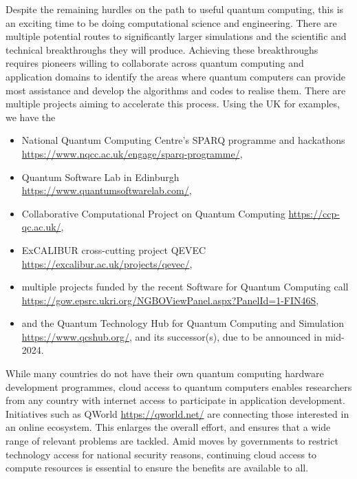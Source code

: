 \documentclass[10pt]{iopart}
\begin{document}
Despite the remaining hurdles on the path to useful quantum computing, this is an exciting time to be doing computational science and engineering. There are multiple potential routes to significantly larger simulations and the scientific and technical breakthroughs they will produce.  Achieving these breakthroughs requires pioneers willing to collaborate across quantum computing and application domains to identify the areas where quantum computers can provide most assistance and develop the algorithms and codes to realise them. 
There are multiple projects aiming to accelerate this process.  Using the UK for examples, we have the
\begin{itemize}
\item National Quantum Computing Centre's SPARQ programme and hackathons \url{https://www.nqcc.ac.uk/engage/sparq-programme/},
\item Quantum Software Lab in Edinburgh \url{https://www.quantumsoftwarelab.com/},
\item Collaborative Computational Project on Quantum Computing \url{https://ccp-qc.ac.uk/}, 
\item ExCALIBUR cross-cutting project QEVEC \url{https://excalibur.ac.uk/projects/qevec/}, 
\item multiple projects funded by the recent Software for Quantum Computing call \url{https://gow.epsrc.ukri.org/NGBOViewPanel.aspx?PanelId=1-FIN46S}, 
\item and the Quantum Technology Hub for Quantum Computing and Simulation \url{https://www.qcshub.org/}, and its successor(s), due to be announced in mid-2024.
\end{itemize}
While many countries do not have their own quantum computing hardware development programmes, 
cloud access to quantum computers enables researchers from any country with internet access to participate in application development.  Initiatives such as QWorld \url{https://qworld.net/} are connecting those interested in an online ecosystem.  This enlarges the overall effort, and ensures that a wide range of relevant problems are tackled.  Amid moves by governments to restrict technology access for national security reasons, continuing cloud access to compute resources is essential to ensure the benefits are available to all.

\vspace{1em}


\end{document}
